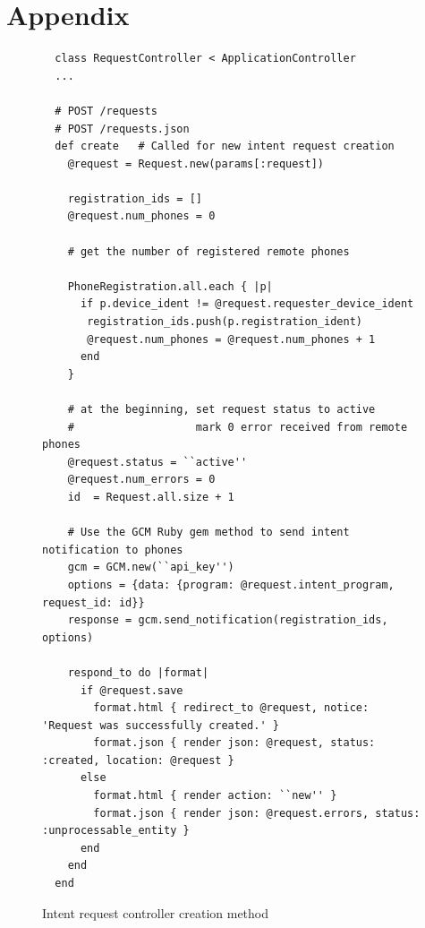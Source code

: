 \documentclass{acm_proc_article-sp}
\begin{document}
\nocite{*}




\section{Appendix}

\begin{figure}
\begin{lstlisting}
  class RequestController < ApplicationController
  ...

  # POST /requests
  # POST /requests.json
  def create   # Called for new intent request creation
    @request = Request.new(params[:request])

    registration_ids = []
    @request.num_phones = 0

    # get the number of registered remote phones 

    PhoneRegistration.all.each { |p|
      if p.device_ident != @request.requester_device_ident
       registration_ids.push(p.registration_ident)
       @request.num_phones = @request.num_phones + 1
      end
    }

    # at the beginning, set request status to active
    #                   mark 0 error received from remote phones
    @request.status = ``active''
    @request.num_errors = 0
    id  = Request.all.size + 1

    # Use the GCM Ruby gem method to send intent notification to phones
    gcm = GCM.new(``api_key'')
    options = {data: {program: @request.intent_program, request_id: id}}
    response = gcm.send_notification(registration_ids, options)

    respond_to do |format|
      if @request.save
        format.html { redirect_to @request, notice: 'Request was successfully created.' }
        format.json { render json: @request, status: :created, location: @request }
      else
        format.html { render action: ``new'' }
        format.json { render json: @request.errors, status: :unprocessable_entity }
      end
    end
  end
\end{lstlisting}
\caption{Intent request controller creation method}
\label{fig:intent_request_controller_create}
\end{figure}
\end{document}
